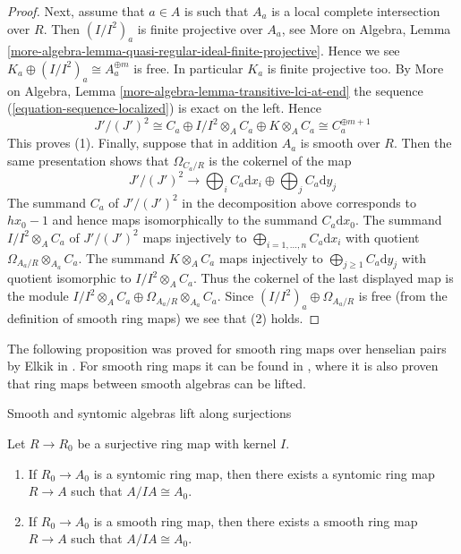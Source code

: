 \begin{proof}
\medskip\noindent
Next, assume that $a \in A$ is such that $A_a$ is a local complete
intersection over $R$. Then $(I/I^2)_a$ is finite projective over $A_a$, see
More on Algebra, Lemma
\ref{more-algebra-lemma-quasi-regular-ideal-finite-projective}.
Hence we see $K_a \oplus (I/I^2)_a \cong A_a^{\oplus m}$ is free.
In particular $K_a$ is finite projective too.
By More on Algebra, Lemma \ref{more-algebra-lemma-transitive-lci-at-end}
the sequence (\ref{equation-sequence-localized}) is exact on the left.
Hence
$$
J'/(J')^2 \cong
C_a \oplus I/I^2 \otimes_A C_a \oplus K \otimes_A C_a \cong
C_a^{\oplus m + 1}
$$
This proves (1). Finally, suppose that in addition $A_a$ is smooth over
$R$. Then the same presentation shows that $\Omega_{C_a/R}$
is the cokernel of the map
$$
J'/(J')^2 \longrightarrow
\bigoplus\nolimits_i C_a\text{d}x_i \oplus \bigoplus\nolimits_j C_a\text{d}y_j
$$
The summand $C_a$ of $J'/(J')^2$ in the decomposition above
corresponds to $hx_0 - 1$ and hence maps
isomorphically to the summand $C_a\text{d}x_0$. The summand
$I/I^2 \otimes_A C_a$ of $J'/(J')^2$ maps injectively to
$\bigoplus_{i = 1, \ldots, n} C_a\text{d}x_i$
with quotient $\Omega_{A_a/R} \otimes_{A_a} C_a$. The summand
$K \otimes_A C_a$ maps injectively to
$\bigoplus_{j \geq 1} C_a\text{d}y_j$ with quotient isomorphic to
$I/I^2 \otimes_A C_a$. Thus the cokernel of the last displayed
map is the module
$I/I^2 \otimes_A C_a \oplus \Omega_{A_a/R} \otimes_{A_a} C_a$.
Since $(I/I^2)_a \oplus \Omega_{A_a/R}$ is
free (from the definition of smooth ring maps) we see that (2) holds.
\end{proof}

\noindent
The following proposition was proved for smooth ring maps over henselian
pairs by Elkik in \cite{Elkik}. For smooth ring maps it can be found in
\cite{Arabia}, where it is also proven that ring maps between smooth
algebras can be lifted.

\begin{proposition}
\label{proposition-lift-smooth}
\begin{slogan}
Smooth and syntomic algebras lift along surjections
\end{slogan}
Let $R \to R_0$ be a surjective ring map with kernel $I$.
\begin{enumerate}
\item If $R_0 \to A_0$ is a syntomic ring map, then there exists a syntomic
ring map $R \to A$ such that $A/IA \cong A_0$.
\item If $R_0 \to A_0$ is a smooth ring map, then there exists a smooth
ring map $R \to A$ such that $A/IA \cong A_0$.
\end{enumerate}
\end{proposition}

